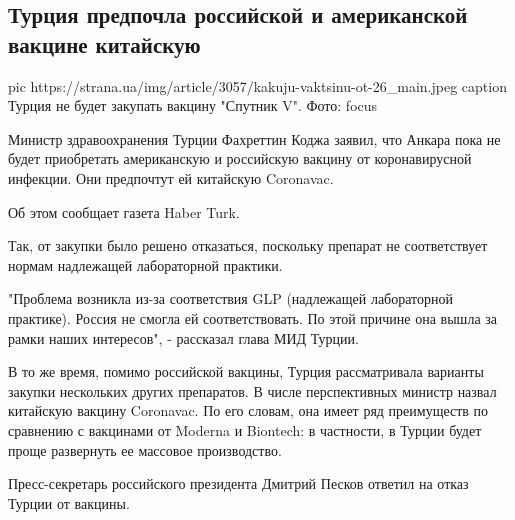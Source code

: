  
 
 
 
 
 
\subsection{Турция предпочла российской и американской вакцине китайскую}
\label{sec:09_12_2020.news.ua.strana.3.turcia_vaccine_russia}

\ifcmt
pic https://strana.ua/img/article/3057/kakuju-vaktsinu-ot-26_main.jpeg
caption Турция не будет закупать вакцину "Спутник V". Фото: focus 
\fi

Министр здравоохранения Турции Фахреттин Коджа заявил, что Анкара пока не будет
приобретать американскую и  российскую вакцину от коронавирусной инфекции. Они
предпочтут ей китайскую Coronavac. 

Об этом сообщает газета Haber Turk.

Так, от закупки было решено отказаться, поскольку препарат не соответствует
нормам надлежащей лабораторной практики.

"Проблема возникла из-за соответствия GLP (надлежащей лабораторной практике).
Россия не смогла ей соответствовать. По этой причине она вышла за рамки наших
интересов", - рассказал глава МИД Турции.

В то же время, помимо российской вакцины, Турция рассматривала варианты закупки
нескольких других препаратов. В числе перспективных министр назвал китайскую
вакцину Coronavac. По его словам, она имеет ряд преимуществ по сравнению с
вакцинами от Moderna и Biontech: в частности, в Турции будет проще развернуть
ее массовое производство.

Пресс-секретарь российского президента Дмитрий Песков ответил на отказ Турции
от вакцины.


